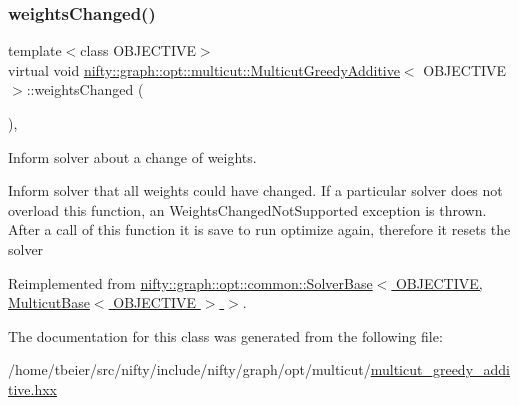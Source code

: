 \subsubsection{\texorpdfstring{weights\+Changed()}{weightsChanged()}}
{\footnotesize\ttfamily template$<$class O\+B\+J\+E\+C\+T\+I\+VE$>$ \\
virtual void \hyperlink{classnifty_1_1graph_1_1opt_1_1multicut_1_1MulticutGreedyAdditive}{nifty\+::graph\+::opt\+::multicut\+::\+Multicut\+Greedy\+Additive}$<$ O\+B\+J\+E\+C\+T\+I\+VE $>$\+::weights\+Changed (\begin{DoxyParamCaption}{ }\end{DoxyParamCaption})\hspace{0.3cm}{\ttfamily [inline]}, {\ttfamily [virtual]}}



Inform solver about a change of weights. 

Inform solver that all weights could have changed. If a particular solver does not overload this function, an Weights\+Changed\+Not\+Supported exception is thrown. After a call of this function it is save to run optimize again, therefore it resets the solver 

Reimplemented from \hyperlink{classnifty_1_1graph_1_1opt_1_1common_1_1SolverBase_a6a5d77ee514c4b5f44d1908c1000f0ff}{nifty\+::graph\+::opt\+::common\+::\+Solver\+Base$<$ O\+B\+J\+E\+C\+T\+I\+V\+E, Multicut\+Base$<$ O\+B\+J\+E\+C\+T\+I\+V\+E $>$ $>$}.



The documentation for this class was generated from the following file\+:\begin{DoxyCompactItemize}
\item 
/home/tbeier/src/nifty/include/nifty/graph/opt/multicut/\hyperlink{multicut__greedy__additive_8hxx}{multicut\+\_\+greedy\+\_\+additive.\+hxx}\end{DoxyCompactItemize}
